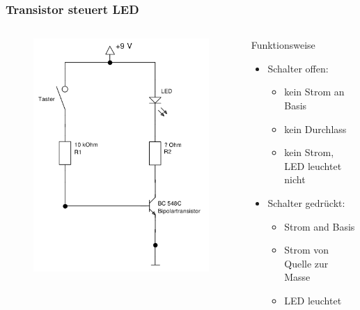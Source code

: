 \begin{frame}
    \frametitle{Transistor steuert LED}
    \begin{columns}[c]
        \begin{figure}[H]
        \begin{center}
                \includegraphics[scale=0.35]{./img/schaltungen/transistorLED_1.png}
        \end{center}
        \end{figure}
    \begin{block}{Funktionsweise}
         \begin{itemize}
            \item Schalter offen:
            \begin{itemize}
                \item kein Strom an Basis
                \item kein Durchlass
                \item kein Strom, LED leuchtet nicht
            \end{itemize}
            \pause
            \item Schalter gedrückt:
            \begin{itemize}
                \item Strom and Basis
                \item Strom von Quelle zur Masse
                \item LED leuchtet
            \end{itemize}
         \end{itemize}
    \end{block}
    \end{columns}
\end{frame}

